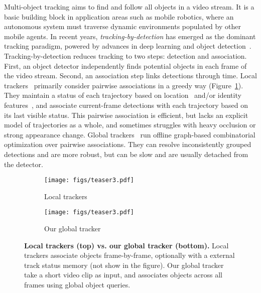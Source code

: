 \documentclass[10pt,twocolumn,letterpaper]{article}
\newcommand{\reffig}[1]{Figure~\ref{fig:#1}}
\newcommand{\lblfig}[1]{\label{fig:#1}}
\begin{document}
Multi-object tracking aims to find and follow all objects in a video stream.
It is a basic building block in application areas such as mobile robotics, where an autonomous system must traverse dynamic environments populated by other mobile agents.
In recent years, \emph{tracking-by-detection} has emerged as the dominant tracking paradigm, powered by advances in deep learning and object detection~\cite{ren2015faster,he2017mask}.
Tracking-by-detection reduces tracking to two steps: detection and association.
First, an object detector independently finds potential objects in each frame of the video stream.
Second, an association step links detections through time.
Local trackers~\cite{Bewley2016_sort,Wojke2018deep,bergmann2019tracking,zhang2020fair,wang2019towards,xu2019spatial} primarily consider pairwise associations in a greedy way (\reffig{teaser:local}).
They maintain a status of each trajectory based on location~\cite{zhou2020tracking,Bewley2016_sort} and/or identity features~\cite{zhang2020fair,Wojke2018deep},
and associate current-frame detections with each trajectory based on its last visible status.
This pairwise association is efficient, but lacks an explicit model of trajectories as a whole, and sometimes struggles with heavy occlusion or strong appearance change.
Global trackers~\cite{zhang2008global,tang2017multiple,braso2020learning,yu2007multiple,berclaz2011multiple} run offline graph-based combinatorial optimization over pairwise associations.
They can resolve inconsistently grouped detections and are more robust, but can be slow and are usually detached from the detector.
\begin{figure}[!t]
\centering
    \begin{subfigure}{\linewidth}
    \texttt{[image: figs/teaser3.pdf]}
    \caption{Local trackers}
    \lblfig{teaser:local}
    \end{subfigure}
    \begin{subfigure}{\linewidth}
    \texttt{[image: figs/teaser3.pdf]}
    \caption{Our global tracker}
    \lblfig{teaser:ours}
    \vspace{-3mm}
    \end{subfigure}
   \caption{
   \textbf{Local trackers (top) vs. our global tracker (bottom).} 
   Local trackers associate objects frame-by-frame, optionally with a external track status memory (not show in the figure). Our global tracker take a short video clip as input, and associates objects across all frames using global object queries.
   }
\lblfig{teaser}
\vspace{-5mm}
\end{figure}
\end{document}
